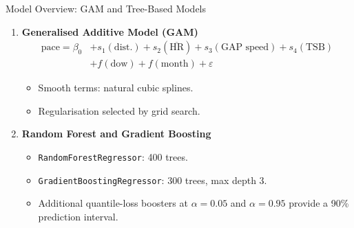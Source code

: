 \documentclass{beamer}
\begin{document}
\begin{frame}{Model Overview: GAM and Tree-Based Models}

\begin{enumerate}
    \item \textbf{Generalised Additive Model (GAM)}
    \begin{align*}
    \text{pace}
    = \beta_0
    &+ s_1(\text{dist.})
    + s_2(\overline{\text{HR}})
    + s_3(\text{GAP speed})
    + s_4(\text{TSB})\\
    &+ f(\text{dow})
    + f(\text{month})
    + \varepsilon
    \end{align*}

    \begin{itemize}
        \item Smooth terms: natural cubic splines.
        \item Regularisation selected by grid search.
    \end{itemize}

    \vspace{0.3cm}

    \item \textbf{Random Forest and Gradient Boosting}

    \vspace{0.15cm}

    \begin{itemize}
        \item \texttt{RandomForestRegressor}: 400 trees.
        \item \texttt{GradientBoostingRegressor}: 300 trees, max depth 3.
        \item Additional quantile-loss boosters at $\alpha = 0.05$ and $\alpha = 0.95$ provide a 90\% prediction interval.
    \end{itemize}

\end{enumerate}
\end{frame}
\end{document}
